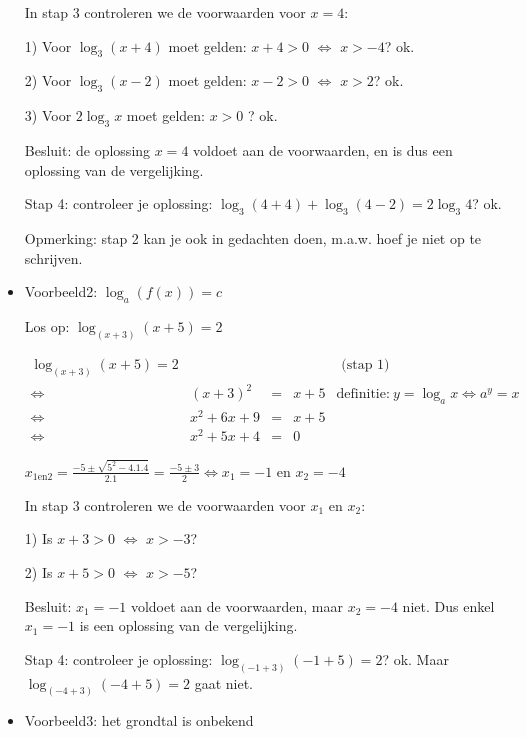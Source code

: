 \begin{itemize}
In stap 3 controleren we de voorwaarden voor $x=4$:

1) Voor ${\displaystyle \log_{3}(x+4)}$ moet gelden: $x+4>0$ $\Longleftrightarrow$
$x>-4$? ok.

2) Voor ${\displaystyle \log_{3}(x-2)}$ moet gelden: $x-2>0$ $\Longleftrightarrow$
$x>2$? ok.

3) Voor ${\displaystyle 2\log_{3}x}$ moet gelden: $x>0$ ? ok.

Besluit: de oplossing $x=4$ voldoet aan de voorwaarden, en is dus
een oplossing van de vergelijking.

Stap 4: controleer je oplossing: ${\displaystyle \log_{3}(4+4)+\log_{3}(4-2)=2\log_{3}4}$?
ok.

Opmerking: stap 2 kan je ook in gedachten doen, m.a.w. hoef je niet
op te schrijven.


\item{Voorbeeld2: ${\displaystyle \log_{a}\left(f(x)\right)=c}$ }

Los op: ${\displaystyle \log_{(x+3)}(x+5)=2}$

\[
{\displaystyle \begin{split}{\displaystyle \log_{(x+3)}(x+5)=2} &  &  &  & \text{ (stap 1)}\\
	\Longleftrightarrow & (x+3)^{2} & = & x+5 & \textrm{definitie:}\:{\displaystyle y=\log_{a}x\Leftrightarrow a^{y}=x}\\
	\Longleftrightarrow & x^{2}+6x+9 & = & x+5 & \text{}\\
	\Longleftrightarrow & x^{2}+5x+4 & = & 0
	\end{split}
}
\]


${\displaystyle x_{1\textrm{en}2}=\frac{-5\pm\sqrt{5^{2}-4.1.4}}{2.1}=\frac{-5\pm3}{2}\Longleftrightarrow x_{1}=-1}$
en ${\displaystyle x_{2}=-4}$

In stap 3 controleren we de voorwaarden voor $x_{1}$ en $x_{2}$:

1) Is $x+3>0$ $\Longleftrightarrow$ $x>-3$? 

2) Is $x+5>0$ $\Longleftrightarrow$ $x>-5$? 

Besluit: ${\displaystyle x_{1}=-1}$ voldoet aan de voorwaarden, maar
${\displaystyle x_{2}=-4}$ niet. Dus enkel ${\displaystyle x_{1}=-1}$
is een oplossing van de vergelijking.

Stap 4: controleer je oplossing: ${\displaystyle \log_{(-1+3)}(-1+5)=2}$?
ok. Maar ${\displaystyle \log_{(-4+3)}(-4+5)=2}$ gaat niet.


\item{Voorbeeld3: het grondtal is onbekend}


\end{itemize}
